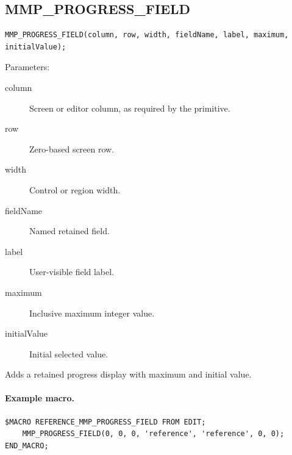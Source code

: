 \documentclass[a4paper,10pt,twoside,openany]{book}
\newenvironment{mrmacextension}{\begin{changebar}}{\end{changebar}}
\begin{document}
\begin{mrmacextension}
\label{prim:procedure-mmp-progress-field}
\subsection*{MMP\_PROGRESS\_FIELD}
\begin{verbatim}
MMP_PROGRESS_FIELD(column, row, width, fieldName, label, maximum, initialValue);
\end{verbatim}
Parameters:
\begin{description}
\item[column] Screen or editor column, as required by the primitive.
\item[row] Zero-based screen row.
\item[width] Control or region width.
\item[fieldName] Named retained field.
\item[label] User-visible field label.
\item[maximum] Inclusive maximum integer value.
\item[initialValue] Initial selected value.
\end{description}

Adds a retained progress display with maximum and initial value.

\paragraph{Example macro.}
\begin{verbatim}
$MACRO REFERENCE_MMP_PROGRESS_FIELD FROM EDIT;
    MMP_PROGRESS_FIELD(0, 0, 0, 'reference', 'reference', 0, 0);
END_MACRO;
\end{verbatim}
\end{mrmacextension}
\end{document}
